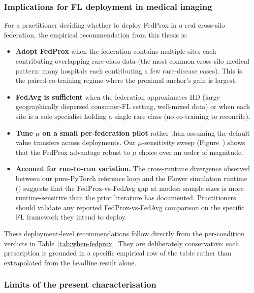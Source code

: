 \subsubsection{Implications for FL deployment in medical imaging}
\label{sec:when-fedprox-deployment}

For a practitioner deciding whether to deploy FedProx in a real
cross-silo federation, the empirical recommendation from this
thesis is:

\begin{itemize}
  \item \textbf{Adopt FedProx} when the federation contains
        multiple sites each contributing overlapping rare-class
        data (the most common cross-silo medical pattern: many
        hospitals each contributing a few rare-disease cases).
        This is the paired-co-training regime where the proximal
        anchor's gain is largest.
  \item \textbf{FedAvg is sufficient} when the federation
        approximates IID (large geographically dispersed
        consumer-FL setting, well-mixed data) or when each
        site is a sole specialist holding a single rare class
        (no co-training to reconcile).
  \item \textbf{Tune $\mu$ on a small per-federation pilot}
        rather than assuming the default value transfers across
        deployments. Our $\mu$-sensitivity sweep
        (Figure~) shows that the
        FedProx advantage  robust to
        $\mu$ choice over an order of magnitude.
  \item \textbf{Account for run-to-run variation.} The
        cross-runtime divergence observed between our
        pure-PyTorch reference loop and the Flower simulation
        runtime () suggests
        that the FedProx-vs-FedAvg gap at modest sample sizes
        is more runtime-sensitive than the prior literature has
        documented. Practitioners should validate any reported
        FedProx-vs-FedAvg comparison on the specific FL
        framework they intend to deploy.
\end{itemize}

These deployment-level recommendations follow directly from the
per-condition verdicts in Table~\ref{tab:when-fedprox}. They are
deliberately conservative: each prescription is grounded in a
specific empirical row of the table rather than extrapolated from
the headline result alone.

\subsubsection{Limits of the present characterisation}
\label{sec:when-fedprox-limits}

